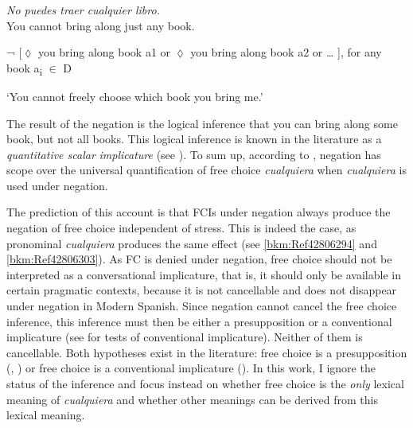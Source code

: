 \ea \label{bkm:Ref43030327} %
  \textit{No puedes traer \emph{cualquier} libro.}\\
  You cannot bring along just any book.

  ¬ [${\lozenge}$ you bring along book a1 or ${\lozenge}$ you bring along book a2 or … ], for any book a\textsubscript{i} ${\in}$ D

  ‘You cannot freely choose which book you bring me.’
\z


The result of the negation is the logical inference that you can bring along some book, but not all books. This logical inference is known in the literature as a \textit{quantitative scalar} \textit{implicature} (see \citealt{Chierchia2006,Chierchia2013}). To sum up, according to \citet{Aloni2007}, negation has scope over the universal quantification of free choice \textit{cualquiera} when \textit{cualquiera} is used under negation.

The prediction of this account is that FCIs under negation always produce the negation of free choice independent of stress. This is indeed the case, as pronominal \textit{cualquiera} produces the same effect (see \ref{bkm:Ref42806294} and \ref{bkm:Ref42806303}). As FC is denied under negation, free choice should not be interpreted as a conversational implicature, that is, it should only be available in certain pragmatic contexts, because it is not cancellable and does not disappear under negation in Modern Spanish. Since negation cannot cancel the free choice inference, this inference must then be either a presupposition or a conventional implicature (see \citealt{Potts2005} for tests of conventional implicature). Neither of them is cancellable. Both hypotheses exist in the literature: free choice is a presupposition (\citealt{Fintel2000}, \citealt{ChoiRomero2008}) or free choice is a conventional implicature (\citealt{Aloni2007,Aloni2021}). In this work, I ignore the status of the inference and focus instead on whether free choice is the \textit{only} lexical meaning of \textit{cualquiera} and whether other meanings can be derived from this lexical meaning.

